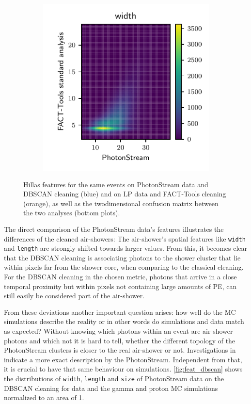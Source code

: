 \begin{figure}
\begin{subfigure}{0.5\textwidth}
  \end{subfigure}
  \begin{subfigure}{0.5\textwidth}
    \centering
    \includegraphics[width=\textwidth, page=2]{Plots/std_phs_comparison_DBSCAN_crab.pdf}
  \end{subfigure}
  \caption{Hillas features for the same events on PhotonStream data and DBSCAN cleaning (blue) and on LP data and FACT-Tools cleaning (orange), as well as the twodimensional confusion matrix between the two analyses (bottom plots).}
  \label{fig:feat_comp}
\end{figure}
%
The direct comparison of the PhotonStream data's features illustrates the
differences of the cleaned air-showers: The air-shower's spatial features like
\texttt{width} and \texttt{length} are strongly shifted towards larger values.
From this, it becomes clear that the DBSCAN cleaning is associating photons to
the shower cluster that lie within pixels far from the shower core, when
comparing to the classical cleaning. For the DBSCAN cleaning in the chosen
metric, photons that arrive in a close temporal proximity but within pixels not
containing large amounts of PE, can still easily be considered part of the
air-shower.

From these deviations another important question arises: how well do the MC
simulations describe the reality or in other words do simulations and data
match as expected? Without knowing which photons within an event are air-shower
photons and which not it is hard to tell, whether the different topology of the
PhotonStream clusters is closer to the real air-shower or not.
Investigations in~\cite{sebastian} indicate a more exact description by the PhotonStream. Independent from that, it is crucial to
have that same behaviour on simulations. \autoref{fig:feat_dbscan} shows the
distributions of \texttt{width}, \texttt{length} and \texttt{size} of
PhotonStream data on the DBSCAN cleaning for data and the gamma and proton MC
simulations normalized to an area of \num{1}.


